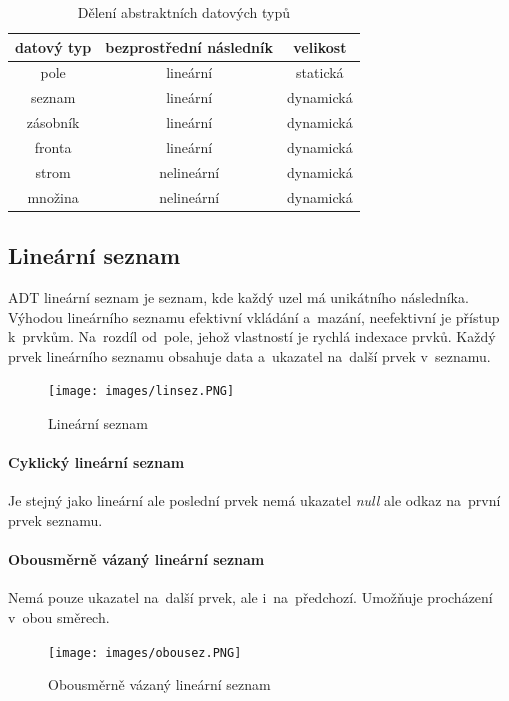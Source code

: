 \begin{table}[ht]
	\centering
	\caption{Dělení abstraktních datových typů}
	\begin{tabular}{|c||c|c|}\hline
		datový typ & bezprostřední následník & velikost  \\\hline\hline
		pole       & lineární                & statická  \\\hline
		seznam     & lineární                & dynamická \\\hline
		zásobník   & lineární                & dynamická \\\hline
		fronta     & lineární                & dynamická \\\hline
		strom      & nelineární              & dynamická \\\hline
		množina    & nelineární              & dynamická \\\hline
	\end{tabular}
\end{table}

\subsection{Lineární seznam}

ADT lineární seznam je seznam, kde každý uzel má unikátního následníka. Výhodou lineárního seznamu efektivní vkládání a~mazání, neefektivní je přístup k~prvkům. Na~rozdíl od~pole, jehož vlastností je rychlá indexace prvků. Každý prvek lineárního seznamu obsahuje data a~ukazatel na~další prvek v~seznamu.

\begin{figure}[ht]
	\centering
	\texttt{[image: images/linsez.PNG]}
	\caption{Lineární seznam}
	\label{linsez}
\end{figure}

\paragraph{Cyklický lineární seznam} Je stejný jako lineární ale poslední prvek nemá ukazatel \emph{null} ale odkaz na~první prvek seznamu.

\paragraph{Obousměrně vázaný lineární seznam} Nemá pouze ukazatel na~další prvek, ale i~na~předchozí. Umožňuje procházení v~obou směrech.

\begin{figure}[ht]
	\centering
	\texttt{[image: images/obousez.PNG]}
	\caption{Obousměrně vázaný lineární seznam}
	\label{obousez}
\end{figure}

